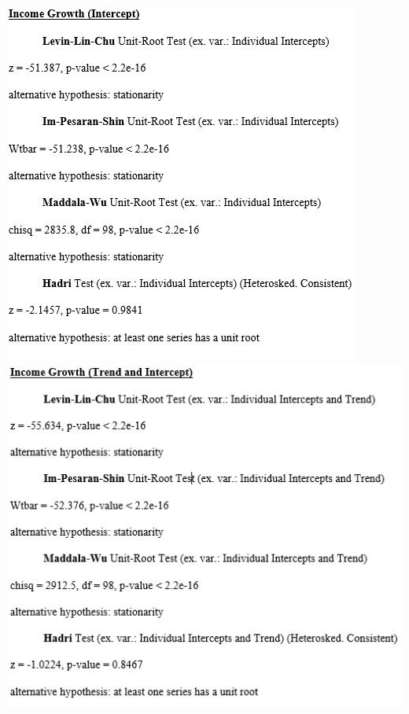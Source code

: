 \documentclass[11pt,preprint, authoryear]{elsarticle}
\numberwithin{equation}{section}
\numberwithin{figure}{section}
\numberwithin{table}{section}
\begin{document}
\begin{center}\includegraphics[width=0.49\linewidth,height=0.35\textheight]{images/Income_Growth_Intercept} \includegraphics[width=0.49\linewidth,height=0.35\textheight]{images/Income_Growth_Trend} \end{center}


\end{document}
